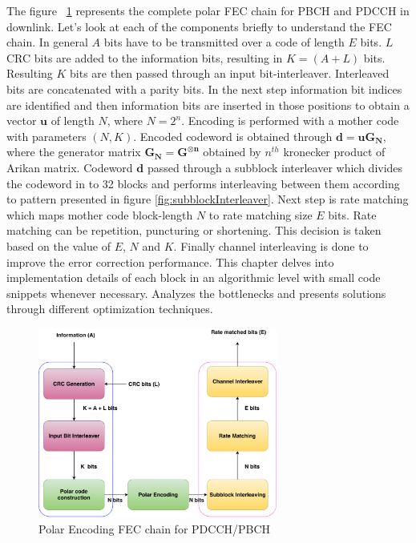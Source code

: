 The figure ~\ref{fig:5g_txfec_chain} represents the complete polar FEC chain for PBCH and PDCCH in downlink. Let's look at each of the components briefly to understand the FEC chain. In general $A$ bits have to be transmitted over a code of length $E$ bits. $L$ CRC bits are added to the information bits, resulting in  $K = (A + L)$ bits. Resulting $K$ bits are then passed through an input bit-interleaver. Interleaved bits are concatenated with a parity bits. In the next step information bit indices are identified and then information bits are inserted in those positions to obtain a vector $\boldsymbol{u}$ of length $N$, where $N = 2^{n}$. Encoding is performed with a mother code with parameters $(N,K)$. Encoded codeword is obtained through $\boldsymbol{d = uG_{N}}$, where the generator matrix $\boldsymbol{G_{N} = G^{\otimes n}}$ obtained by $n^{th}$ kronecker product of Arikan matrix. Codeword $\boldsymbol{d}$ passed through a subblock interleaver which divides the codeword in to 32 blocks and performs interleaving between them according to pattern presented in figure \ref{fig:subblockInterleaver}. Next step is rate matching which maps mother code block-length $N$ to rate matching size $E$ bits. Rate matching can be repetition, puncturing or shortening. This decision is taken based on the value of $E$, $N$ and $K$. Finally channel interleaving is done to improve the error correction performance. This chapter delves into implementation details of each block in an algorithmic level with small code snippets whenever necessary. Analyzes the bottlenecks and presents solutions through different optimization techniques.


\begin{figure}[h]
	\centering
	\includegraphics[width=0.7\textwidth]{./figures/5GFECChain.pdf}
	\caption{Polar Encoding FEC chain for PDCCH/PBCH}
	\label{fig:5g_txfec_chain}
\end{figure}

